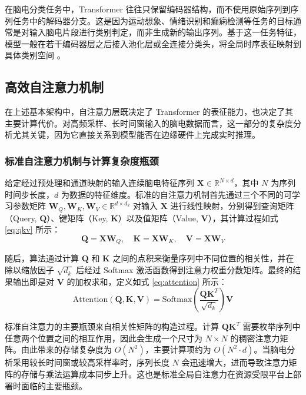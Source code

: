 在脑电分类任务中，Transformer 往往只保留编码器结构，而不使用原始序列到序列任务中的解码器分支。这是因为运动想象、情绪识别和癫痫检测等任务的目标通常是对输入脑电片段进行类别判定，而非生成新的输出序列。基于这一任务特征，模型一般在若干编码器层之后接入池化层或全连接分类头，将全局时序表征映射到具体类别空间 \cite{songEEG2022, xie_transformer-based_2022}。

\subsection{高效自注意力机制}

在上述基本架构中，自注意力层既决定了 Transformer 的表征能力，也决定了其主要计算代价。对高频采样、长时间窗输入的脑电数据而言，这一部分的复杂度分析尤其关键，因为它直接关系到模型能否在边缘硬件上完成实时推理。

\subsubsection{标准自注意力机制与计算复杂度瓶颈}

给定经过预处理和通道映射的输入连续脑电特征序列 $\mathbf{X} \in \mathbb{R}^{N \times d}$，其中 $N$ 为序列时间步长度，$d$ 为数据的特征维度。标准的自注意力机制首先通过三个不同的可学习参数矩阵 $\mathbf{W}_Q, \mathbf{W}_K, \mathbf{W}_V \in \mathbb{R}^{d \times d_k}$ 对输入 $\mathbf{X}$ 进行线性映射，分别得到查询矩阵（Query, $\mathbf{Q}$）、键矩阵（Key, $\mathbf{K}$）以及值矩阵（Value, $\mathbf{V}$），其计算过程如式 \eqref{eq:qkv} 所示：
\begin{equation} \label{eq:qkv}
\mathbf{Q} = \mathbf{X}\mathbf{W}_Q, \quad \mathbf{K} = \mathbf{X}\mathbf{W}_K, \quad \mathbf{V} = \mathbf{X}\mathbf{W}_V
\end{equation}

随后，算法通过计算 $\mathbf{Q}$ 和 $\mathbf{K}$ 之间的点积来衡量序列中不同位置的相关性，并在除以缩放因子 $\sqrt{d_k}$ 后经过 Softmax 激活函数得到注意力权重分数矩阵。最终的结果输出即是对 $\mathbf{V}$ 的加权求和，定义如式 \eqref{eq:attention} 所示：
\begin{equation} \label{eq:attention}
\text{Attention}(\mathbf{Q}, \mathbf{K}, \mathbf{V}) = \text{Softmax}\left(\frac{\mathbf{Q}\mathbf{K}^T}{\sqrt{d_k}}\right) \mathbf{V}
\end{equation}

标准自注意力的主要瓶颈来自相关性矩阵的构造过程。计算 $\mathbf{Q}\mathbf{K}^T$ 需要枚举序列中任意两个位置之间的相互作用，因此会生成一个尺寸为 $N \times N$ 的稠密注意力矩阵。由此带来的存储复杂度为 $O(N^2)$，主要计算项约为 $O(N^2 \cdot d)$。当脑电分析采用较长时间窗或较高采样率时，序列长度 $N$ 会迅速增大，进而导致注意力矩阵的存储与乘法运算成本同步上升。这也是标准全局自注意力在资源受限平台上部署时面临的主要瓶颈。

